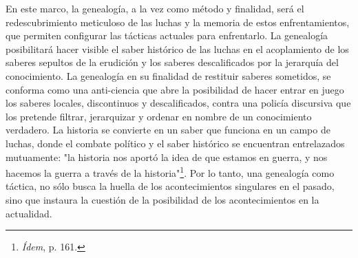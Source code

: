 \documentclass{book}
\begin{document}
En este marco, la genealogía, a la vez como método y finalidad, será el
redescubrimiento meticuloso de las luchas y la memoria de estos
enfrentamientos, que permiten configurar las tácticas actuales para
enfrentarlo. La genealogía posibilitará hacer visible el saber histórico
de las luchas en el acoplamiento de los saberes sepultos de la erudi­ción
y los saberes descalificados por la jerarquía del cono­cimiento. La
genealogía en su finalidad de restituir saberes sometidos, se conforma
como una anti-ciencia que abre la posibilidad de hacer entrar en juego
los saberes locales, discontinuos y descalificados, contra una policía
discursiva que los pretende filtrar, jerarquizar y ordenar en nombre de
un conocimiento verdadero. La historia se convierte en un saber que
funciona en un campo de luchas, donde el combate político y el saber
histórico se encuentran entrelazados mutuamente: "la historia nos aportó
la idea de que estamos en guerra, y nos hacemos la guerra a través de la
historia"\footnote{\emph{Ídem}, p. 161.}. Por lo tanto, una genealogía
como táctica, no sólo busca la huella de los acontecimientos singulares
en el pasado, sino que instaura la cuestión de la posibilidad de los
acontecimientos en la actualidad.
\end{document}
